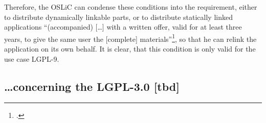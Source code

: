 \begin{itemize}
  Therefore, the OSLiC can condense these conditions into the requirement,
  either to distribute dynamically linkable parts, or to distribute statically
  linked applications \enquote{(accompanied) [\ldots] with a written offer,
  valid for at least three years, to give the same user the [complete]
  materials}\footcite[cf.][\nopage wp.\ §6]{Lgpl21OsiLicense1999a}, so that he
  can relink the application on its own behalf. It is clear, that this condition
  is only valid for the use case LGPL-9.
  
\end{itemize}


\subsection{\ldots concerning the LGPL-3.0 [tbd]}





%
